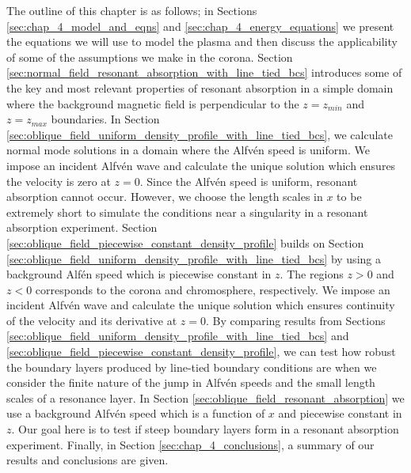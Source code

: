 The outline of this chapter is as follows; in Sections \ref{sec:chap_4_model_and_eqns} and \ref{sec:chap_4_energy_equations} we  present the equations we will use to model the plasma and then discuss the applicability of some of the assumptions we make in the corona. Section \ref{sec:normal_field_resonant_absorption_with_line_tied_bcs} introduces some of the key and most relevant properties of resonant absorption in a simple domain where the background magnetic field is perpendicular to the $z=z_{min}$ and $z=z_{max}$ boundaries. In Section \ref{sec:oblique_field_uniform_density_profile_with_line_tied_bcs}, we calculate normal mode solutions in a domain where the Alfv\'en speed is uniform. We impose an incident Alfv\'en wave and calculate the unique solution which ensures the velocity is zero at $z=0$. Since the Alfv\'en speed is uniform, resonant absorption cannot occur. However, we choose the length scales in $x$ to be extremely short to simulate the conditions near a singularity in a resonant absorption experiment. Section \ref{sec:oblique_field_piecewise_constant_density_profile} builds on Section \ref{sec:oblique_field_uniform_density_profile_with_line_tied_bcs} by using a background Alf\'en speed which is piecewise constant in $z$. The regions $z>0$ and $z<0$ corresponds to the corona and chromosphere, respectively. We impose an incident Alfv\'en wave and calculate the unique solution which ensures continuity of the velocity and its derivative at $z=0$. By comparing results from Sections \ref{sec:oblique_field_uniform_density_profile_with_line_tied_bcs} and \ref{sec:oblique_field_piecewise_constant_density_profile}, we can test how robust the boundary layers produced by line-tied boundary conditions are when we consider the finite nature of the jump in Alfv\'en speeds and the small length scales of a resonance layer. In Section \ref{sec:oblique_field_resonant_absorption} we use a background Alfv\'en speed which is a function of $x$ and piecewise constant in $z$. Our goal here is to test if steep boundary layers form in a resonant absorption experiment. Finally, in Section \ref{sec:chap_4_conclusions}, a summary of our results and conclusions are given.

